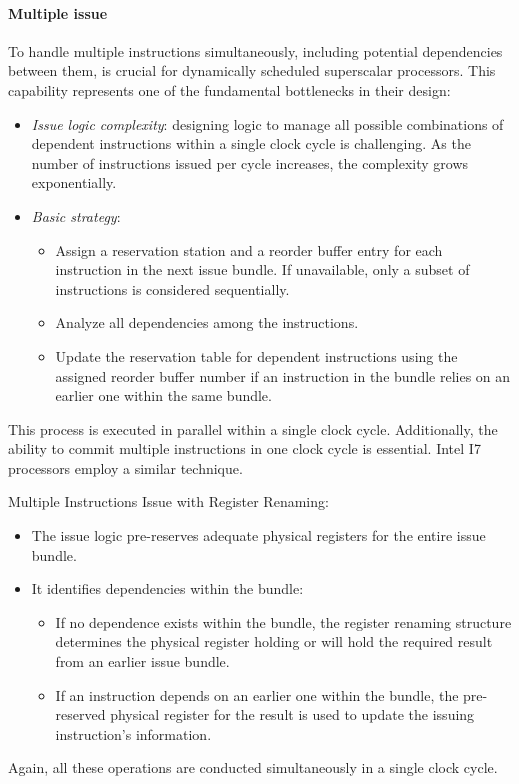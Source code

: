 \paragraph*{Multiple issue}
To handle multiple instructions simultaneously, including potential dependencies between them, is crucial for dynamically scheduled superscalar processors. 
This capability represents one of the fundamental bottlenecks in their design:
\begin{itemize}
    \item \textit{Issue logic complexity}: designing logic to manage all possible combinations of dependent instructions within a single clock cycle is challenging. 
        As the number of instructions issued per cycle increases, the complexity grows exponentially.
    \item \textit{Basic strategy}: 
        \begin{itemize}
            \item Assign a reservation station and a reorder buffer entry for each instruction in the next issue bundle. 
                If unavailable, only a subset of instructions is considered sequentially.
            \item Analyze all dependencies among the instructions.
            \item Update the reservation table for dependent instructions using the assigned reorder buffer number if an instruction in the bundle relies on an earlier one within the same bundle.
        \end{itemize}
\end{itemize}
This process is executed in parallel within a single clock cycle. 
Additionally, the ability to commit multiple instructions in one clock cycle is essential. 
Intel I7 processors employ a similar technique.

Multiple Instructions Issue with Register Renaming:
\begin{itemize}
    \item The issue logic pre-reserves adequate physical registers for the entire issue bundle.
    \item It identifies dependencies within the bundle:
        \begin{itemize}
            \item If no dependence exists within the bundle, the register renaming structure determines the physical register holding or will hold the required result from an earlier issue bundle.
            \item If an instruction depends on an earlier one within the bundle, the pre-reserved physical register for the result is used to update the issuing instruction's information.
        \end{itemize}
\end{itemize}
Again, all these operations are conducted simultaneously in a single clock cycle.

